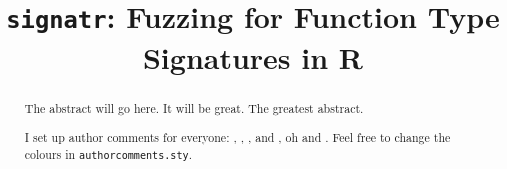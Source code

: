 \documentclass[acmsmall,review, anonymous]{acmart}
\begin{document}
\title{{\tt signatr}: Fuzzing for Function Type Signatures in R}

\begin{abstract}
The abstract will go here.
It will be great.
The greatest abstract.

I set up author comments for everyone: , , , and , oh and .
Feel free to change the colours in {\tt authorcomments.sty}.
\end{abstract}

\maketitle












\end{document}
